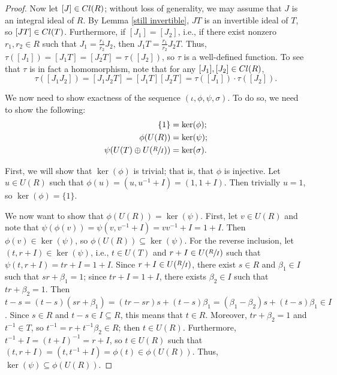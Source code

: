 \documentclass[10pt,a4paper]{amsart}
\newcommand{\Cl}{\textup{Cl}}
\begin{document}
\begin{proof}
    Now let $[J]\in \Cl(R)$; without loss of generality, we may assume that $J$ is an integral ideal of $R$. By Lemma \ref{still invertible}, $JT$ is an invertible ideal of $T$, so $[JT]\in \Cl(T)$. Furthermore, if $[J_1]=[J_2]$, i.e., if there exist nonzero $r_1,r_2\in R$ such that $J_1=\frac{r_1}{r_2}J_2$, then $J_1T=\frac{r_1}{r_2}J_2T$. Thus, $\tau([J_1])=[J_1T]=[J_2T]=\tau([J_2])$, so $\tau$ is a well-defined function. To see that $\tau$ is in fact a homomorphism, note that for any $[J_1],[J_2]\in\Cl(R)$, $$\tau([J_1J_2])=[J_1J_2T]=[J_1T][J_2T]=\tau([J_1])\cdot\tau([J_2]).$$

    We now need to show exactness of the sequence $(\iota,\phi,\psi,\sigma)$. To do so, we need to show the following:
    \begin{align*}
        \{1\}&=\ker(\phi);\\
        \phi(U(R))&=\ker(\psi);\\
        \psi(U(T)\oplus U(\sfrac{R}{I}))&=\ker(\sigma).
    \end{align*}

    First, we will show that $\ker(\phi)$ is trivial; that is, that $\phi$ is injective. Let $u\in U(R)$ such that $\phi(u)=(u,u^{-1}+I)=(1,1+I)$. Then trivially $u=1$, so $\ker(\phi)=\{1\}$.

    We now want to show that $\phi(U(R))=\ker(\psi)$. First, let $v\in U(R)$ and note that $\psi(\phi(v))=\psi(v,v^{-1}+I)=vv^{-1}+I=1+I$. Then $\phi(v)\in \ker(\psi)$, so $\phi(U(R))\subseteq\ker(\psi)$. For the reverse inclusion, let $(t,r+I)\in \ker(\psi)$, i.e., $t\in U(T)$ and $r+I\in U(\sfrac{R}{I})$ such that $\psi(t,r+I)=tr+I=1+I$. Since $r+I\in U(\sfrac{R}{I})$, there exist $s\in R$ and $\beta_1\in I$ such that $sr+\beta_1=1$; since $tr+I=1+I$, there exists $\beta_2\in I$ such that $tr+\beta_2=1$. Then $t-s=(t-s)(sr+\beta_1)=(tr-sr)s+(t-s)\beta_1=(\beta_1-\beta_2)s+(t-s)\beta_1\in I$. Since $s\in R$ and $t-s\in I\subseteq R$, this means that $t\in R$. Moreover, $tr+\beta_2=1$ and $t^{-1}\in T$, so $t^{-1}=r+t^{-1}\beta_2\in R$; then $t\in U(R)$. Furthermore, $t^{-1}+I=(t+I)^{-1}=r+I$, so $t\in U(R)$ such that $(t,r+I)=(t,t^{-1}+I)=\phi(t)\in \phi(U(R))$. Thus, $\ker(\psi)\subseteq \phi(U(R))$.


\end{proof}
\end{document}
